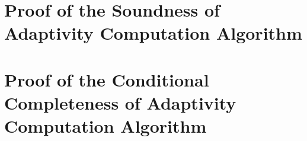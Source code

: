 \documentclass[a4paper,11pt]{article}
\begin{document}
\section{Proof of the Soundness of Adaptivity Computation Algorithm}
\label{apdx:adaptalg_soundness}

\section{Proof of the Conditional Completeness of Adaptivity Computation Algorithm}
\label{apdx:adaptalg_completeness}



\end{document}
